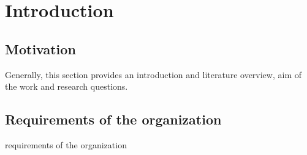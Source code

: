 \section{Introduction}
\label{section:intro}

\subsection{Motivation}
\label{sect:sub-title}

Generally, this section provides an introduction and literature overview, aim of the work and research questions.

\subsection{Requirements of the organization}
\label{sect:sub-title}
requirements of the organization